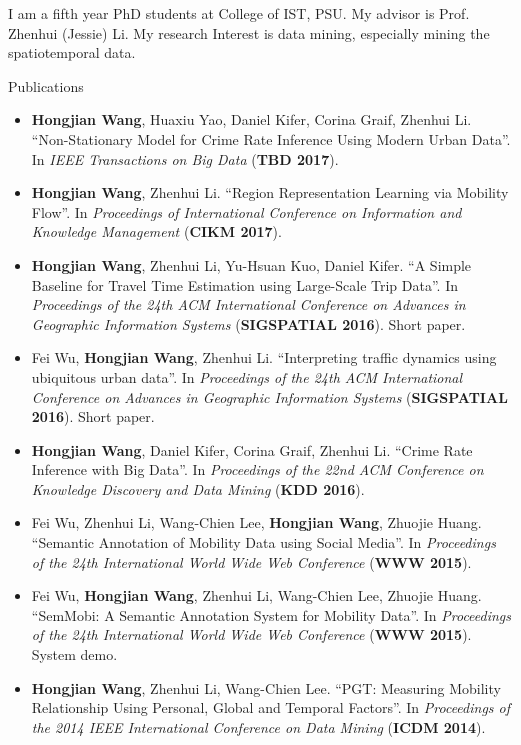 
I am a fifth year PhD students at College of IST, PSU. My advisor is Prof. Zhenhui (Jessie) Li. My research Interest is data mining, especially mining the spatiotemporal data.




\vspace{1cm}

\centerline{Publications}

\begin{itemize}
\item \textbf{Hongjian Wang}, Huaxiu Yao, Daniel Kifer, Corina Graif, Zhenhui Li. ``Non-Stationary Model for Crime Rate Inference Using Modern Urban Data''. In \emph{IEEE Transactions on Big Data} (\textbf{TBD 2017}).
\item \textbf{Hongjian Wang}, Zhenhui Li. ``Region Representation Learning via Mobility Flow''. In \emph{Proceedings of International Conference on Information and Knowledge Management} (\textbf{CIKM 2017}).
\item \textbf{Hongjian Wang}, Zhenhui Li, Yu-Hsuan Kuo, Daniel Kifer. ``A Simple Baseline for Travel Time Estimation using Large-Scale Trip Data''. In \emph{Proceedings of the 24th ACM International Conference on Advances in Geographic Information Systems} (\textbf{SIGSPATIAL 2016}). Short paper.
\item Fei Wu, \textbf{Hongjian Wang}, Zhenhui Li. ``Interpreting traffic dynamics using ubiquitous urban data''. In \emph{Proceedings of the 24th ACM International Conference on Advances in Geographic Information Systems} (\textbf{SIGSPATIAL 2016}). Short paper.
\item \textbf{Hongjian Wang}, Daniel Kifer, Corina Graif, Zhenhui Li. ``Crime Rate Inference with Big Data''. In \emph{Proceedings of the 22nd ACM Conference on Knowledge Discovery and Data Mining} (\textbf{KDD 2016}).
\item Fei Wu, Zhenhui Li, Wang-Chien Lee, \textbf{Hongjian Wang}, Zhuojie Huang. ``Semantic Annotation of Mobility Data using Social Media''. In \emph{Proceedings of the 24th International World Wide Web Conference} (\textbf{WWW 2015}).
\item Fei Wu, \textbf{Hongjian Wang}, Zhenhui Li, Wang-Chien Lee, Zhuojie Huang. ``SemMobi: A Semantic Annotation System for Mobility Data''. In \emph{Proceedings of the 24th International World Wide Web Conference} (\textbf{WWW 2015}). System demo.
\item \textbf{Hongjian Wang}, Zhenhui Li, Wang-Chien Lee. ``PGT: Measuring Mobility Relationship Using Personal, Global and Temporal Factors''. In \emph{Proceedings of the 2014 IEEE International Conference on Data Mining} (\textbf{ICDM 2014}).

\end{itemize}
